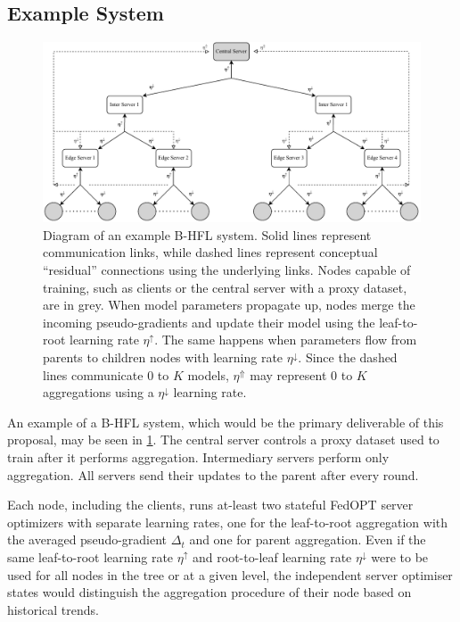 \subsection{Example System}\label{sec:example_system}
\begin{figure}[h]
    \centering
    \includegraphics[clip,width=\columnwidth]{plots/Tree_Structure.drawio.pdf}
    \caption[System Diagram]{Diagram of an example B-HFL system. Solid lines represent communication links, while dashed lines represent conceptual ``residual'' connections using the underlying links. Nodes capable of training, such as clients or the central server with a proxy dataset, are in grey. When model parameters propagate up, nodes merge the incoming pseudo-gradients and update their model using the leaf-to-root learning rate $\eta^\uparrow$. The same happens when parameters flow from parents to children nodes with learning rate $\eta^\downarrow$. Since the dashed lines communicate $0$ to $K$ models, $\eta^\Uparrow$ may represent $0$ to $K$ aggregations using a $\eta^\downarrow$ learning rate.}\label{fig:TreeStructure}
\end{figure}

An example of a B-HFL system, which would be the primary deliverable of this proposal, may be seen in \cref{fig:TreeStructure}. The central server controls a proxy dataset used to train after it performs aggregation. Intermediary servers perform only aggregation. All servers send their updates to the parent after every round.

Each node, including the clients, runs at-least two stateful FedOPT server optimizers with separate learning rates, one for the leaf-to-root aggregation with the averaged pseudo-gradient $\Delta_t$ and one for parent aggregation. Even if the same leaf-to-root learning rate $\eta^\uparrow$ and root-to-leaf learning rate $\eta^\downarrow$ were to be used for all nodes in the tree or at a given level, the independent server optimiser states would distinguish the aggregation procedure of their node based on historical trends.

